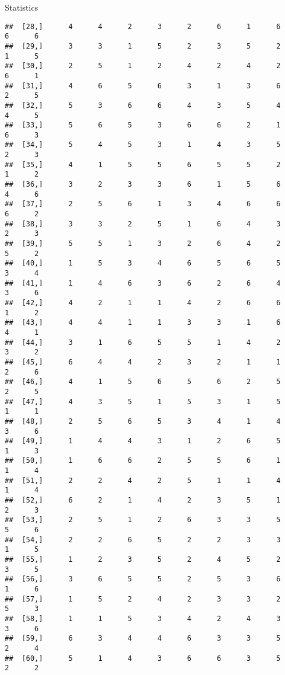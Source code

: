 \documentclass[
  ignorenonframetext,
]{beamer}
\begin{document}
\begin{frame}[fragile]{Statistics}
\begin{verbatim}
##  [28,]      4      4      2      3      2      6      1      6      6      6
##  [29,]      3      3      1      5      2      3      5      2      1      5
##  [30,]      2      5      1      2      4      2      4      2      6      1
##  [31,]      4      6      5      6      3      1      3      6      2      5
##  [32,]      5      3      6      6      4      3      5      4      4      5
##  [33,]      5      6      5      3      6      6      2      1      6      3
##  [34,]      5      4      5      3      1      4      3      5      2      3
##  [35,]      4      1      5      5      6      5      5      2      1      2
##  [36,]      3      2      3      3      6      1      5      6      4      6
##  [37,]      2      5      6      1      3      4      6      6      6      2
##  [38,]      3      3      2      5      1      6      4      3      2      3
##  [39,]      5      5      1      3      2      6      4      2      5      2
##  [40,]      1      5      3      4      6      5      6      5      3      4
##  [41,]      1      4      6      3      6      2      6      4      3      6
##  [42,]      4      2      1      1      4      2      6      6      1      2
##  [43,]      4      4      1      1      3      3      1      6      4      1
##  [44,]      3      1      6      5      5      1      4      2      3      2
##  [45,]      6      4      4      2      3      2      1      1      2      6
##  [46,]      4      1      5      6      5      6      2      5      2      5
##  [47,]      4      3      5      1      5      3      1      5      1      1
##  [48,]      2      5      6      5      3      4      1      4      3      6
##  [49,]      1      4      4      3      1      2      6      5      1      3
##  [50,]      1      6      6      2      5      5      6      1      1      4
##  [51,]      2      2      4      2      5      1      1      4      1      4
##  [52,]      6      2      1      4      2      3      5      1      2      3
##  [53,]      2      5      1      2      6      3      3      5      5      6
##  [54,]      2      2      6      5      2      2      3      3      1      5
##  [55,]      1      2      3      5      2      4      5      2      3      5
##  [56,]      3      6      5      5      2      5      3      6      1      6
##  [57,]      1      5      2      4      2      3      3      2      5      3
##  [58,]      1      1      5      3      4      2      4      3      3      6
##  [59,]      6      3      4      4      6      3      3      5      2      4
##  [60,]      5      1      4      3      6      6      3      5      2      2

\end{verbatim}
\end{frame}
\end{document}
